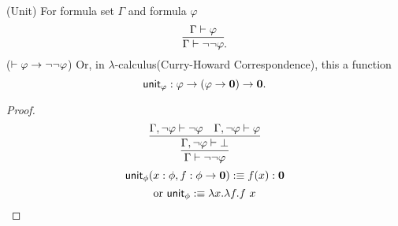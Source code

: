 \newcommand{\unit}{\name{unit}}
\begin{lemma}
    \label{unit-ipc}
    (Unit) For formula set $\Gamma$ and formula $\varphi$
    $$
        \infer{\Gamma\proves \neg\neg \varphi}{\Gamma\proves \varphi}.
    $$
    ($\vdash \varphi\to\neg\neg\varphi$)
    Or, in $\lambda$-calculus(Curry-Howard Correspondence), this a function
    $$
        \unit_\varphi: \varphi \to (\varphi\to \zero)\to \zero.
    $$
\end{lemma}
\begin{proof}
    $$
        \infer{\Gamma\proves \neg\neg \varphi}{
            \infer{\Gamma,\neg \varphi\proves\bot}{
                \Gamma,\neg \varphi\proves\neg \varphi &
                \Gamma,\neg \varphi\proves \varphi
            }
        }
    $$
    $$\unit_\phi(x:\phi, f:\phi\to\zero) \defn f(x):\zero$$
    $$\text{or }\unit_\phi \defn \lambda x.\lambda f. f\ x$$
\end{proof}

